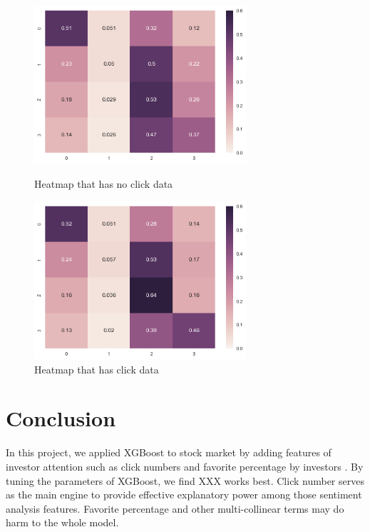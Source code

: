 \documentclass[letterpaper]{article}
\begin{document}
\begin{figure}[htbp]
  \begin{minipage}[t]{0.5\linewidth}
  \centering
  \includegraphics[width=0.7\textwidth]{heatmap_noclick.png}
  \caption{Heatmap that has no click data}
  \end{minipage}
  \begin{minipage}[t]{0.5\linewidth}
  \centering
  \includegraphics[width=0.7\textwidth]{heatmap_hasclick.png}
  \caption{Heatmap that has click data}
  \end{minipage}
\end{figure}


\section{Conclusion}
\label{conclusion}
In this project, we applied XGBoost to stock market by adding features of investor attention such as click numbers and favorite percentage by investors . By tuning the parameters of XGBoost, we find XXX works best. Click number serves as the main engine to provide effective explanatory power among those sentiment analysis features. Favorite percentage and other multi-collinear terms may do harm to the whole model. 
\end{document}
